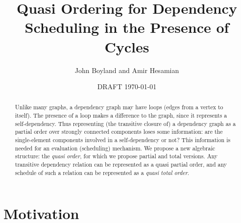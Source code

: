 \documentclass[12pt]{article}
\theoremstyle{definition}
\theoremstyle{theorem}
\begin{document}
\title{Quasi Ordering for Dependency Scheduling in the Presence of Cycles}
\author{John Boyland and Amir Hesamian}
\date{DRAFT \today}

\maketitle

\begin{abstract}
  Unlike many graphs, a dependency graph may have loops (edges from a
  vertex to itself).  The presence of a loop makes a difference to the
  graph, since it represents a self-dependency.  Thus representing
  (the transitive closure of) a dependency graph as a partial order
  over strongly connected components loses some information: are the
  single-element components involved in a self-dependency or not?
  This information is needed for an evaluation (scheduling)
  mechanism.  We propose a new algebraic structure: the \emph{quasi
  order}, for which we propose partial and total versions.  Any
  transitive dependency relation can be represented as a quasi partial
  order, and any schedule of such a relation can be represented as a \emph{quasi total order}. 
\end{abstract}

\section{Motivation}
\end{document}
